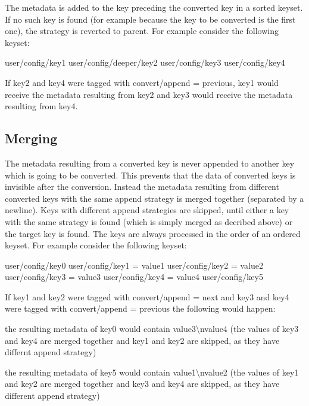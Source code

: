 The metadata is added to the key preceding the converted key in a sorted keyset. If no such key is found (for example because the key to be converted is the first one), the strategy is reverted to parent. For example consider the following keyset\+: \begin{DoxyVerb}user/config/key1
user/config/deeper/key2
user/config/key3
user/config/key4
\end{DoxyVerb}


If key2 and key4 were tagged with {\ttfamily convert/append = previous}, key1 would receive the metadata resulting from key2 and key3 would receive the metadata resulting from key4.

\subsection*{Merging}

The metadata resulting from a converted key is never appended to another key which is going to be converted. This prevents that the data of converted keys is invisible after the conversion. Instead the metadata resulting from different converted keys with the same append strategy is merged together (separated by a newline). Keys with different append strategies are skipped, until either a key with the same strategy is found (which is simply merged as decribed above) or the target key is found. The keys are always processed in the order of an ordered keyset. For example consider the following keyset\+: \begin{DoxyVerb}user/config/key0
user/config/key1 = value1
user/config/key2 = value2
user/config/key3 = value3
user/config/key4 = value4
user/config/key5
\end{DoxyVerb}


If key1 and key2 were tagged with {\ttfamily convert/append = next} and key3 and key4 were tagged with {\ttfamily convert/append = previous} the following would happen\+:
\begin{DoxyItemize}
\item the resulting metadata of key0 would contain {\ttfamily value3\textbackslash{}nvalue4} (the values of key3 and key4 are merged together and key1 and key2 are skipped, as they have differnt append strategy)
\item the resulting metadata of key5 would contain {\ttfamily value1\textbackslash{}nvalue2} (the values of key1 and key2 are merged together and key3 and key4 are skipped, as they have different append strategy)
\end{DoxyItemize}

